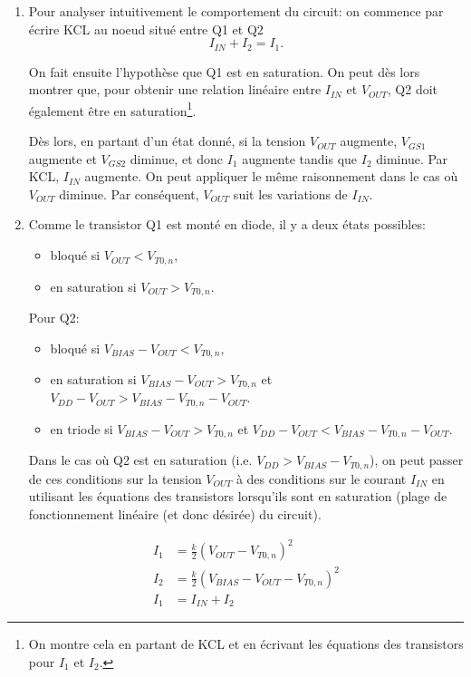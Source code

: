 \begin{enumerate}
	\item Pour analyser intuitivement le comportement du circuit: on commence par écrire KCL
	au noeud situé entre Q1 et Q2
	\[ I_{IN} + I_2 = I_1. \]
	
	On fait ensuite l'hypothèse que Q1 est en saturation. On peut dès lors montrer que, pour
	obtenir une relation linéaire entre $I_{IN}$ et $V_{OUT}$, Q2 doit également être en
	saturation\footnote{On montre cela en partant de KCL et en écrivant les équations
	des transistors pour $I_1$ et $I_2$.}.
	
	Dès lors, en partant d'un état donné, si la tension
	$V_{OUT}$ augmente, $V_{GS1}$ augmente et $V_{GS2}$ diminue, et donc $I_1$ augmente tandis
	que $I_2$ diminue. Par KCL, $I_{IN}$ augmente.
	On peut appliquer le même raisonnement dans le cas où $V_{OUT}$ diminue. Par conséquent,
	$V_{OUT}$ suit les variations de $I_{IN}$.
	
	\item Comme le transistor Q1 est monté en diode, il y a deux états possibles:
	\begin{itemize}
		\item bloqué si $V_{OUT} < V_{T0,n}$,
		\item en saturation si $V_{OUT} > V_{T0,n}$.
	\end{itemize}

	Pour Q2:
	\begin{itemize}
		\item bloqué si $V_{BIAS} - V_{OUT} < V_{T0,n}$,
		\item en saturation si $V_{BIAS} - V_{OUT} > V_{T0,n}$ et $V_{DD} - V_{OUT} > V_{BIAS} -
        V_{T0,n} - V_{OUT}$.
       	\item en triode si $V_{BIAS} - V_{OUT} > V_{T0,n}$ et $V_{DD} - V_{OUT} < V_{BIAS} - V_{T0,n} - V_{OUT}$.
	\end{itemize}

	Dans le cas où Q2 est en saturation (i.e. $V_{DD} > V_{BIAS} - V_{T0,n}$), on peut passer de ces conditions
	sur la tension $V_{OUT}$ à des conditions sur le courant $I_{IN}$ en utilisant les équations des transistors
	lorsqu'ils sont en saturation (plage de fonctionnement linéaire (et donc désirée) du circuit).

	\begin{align*}
    	I_1 &= \frac{k}{2}\left(V_{OUT} - V_{T0,n}\right)^2 \\
    	I_2 &= \frac{k}{2}\left(V_{BIAS} - V_{OUT} - V_{T0,n}\right)^2 \\
    	I_{1} &= I_{IN} + I_{2}
	\end{align*}
    

\end{enumerate}

